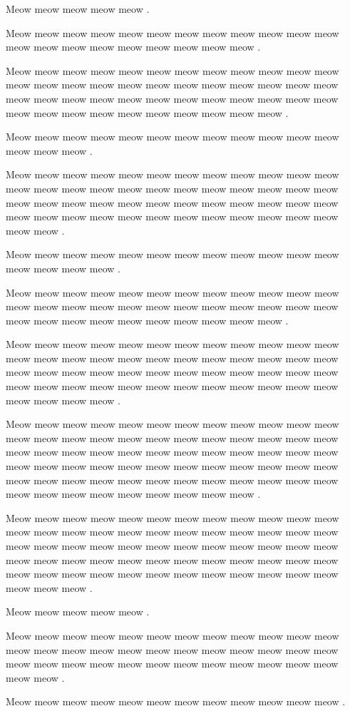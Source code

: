 \documentclass[12pt, a5paper, openany]{book}
\begin{document}
Meow meow meow meow meow .

Meow meow meow meow meow meow meow meow meow meow meow meow meow meow meow meow meow meow meow meow meow .

Meow meow meow meow meow meow meow meow meow meow meow meow meow meow meow meow meow meow meow meow meow meow meow meow meow meow meow meow meow meow meow meow meow meow meow meow meow meow meow meow meow meow meow meow meow meow .

Meow meow meow meow meow meow meow meow meow meow meow meow meow meow meow .

Meow meow meow meow meow meow meow meow meow meow meow meow meow meow meow meow meow meow meow meow meow meow meow meow meow meow meow meow meow meow meow meow meow meow meow meow meow meow meow meow meow meow meow meow meow meow meow meow meow meow .

Meow meow meow meow meow meow meow meow meow meow meow meow meow meow meow meow .

Meow meow meow meow meow meow meow meow meow meow meow meow meow meow meow meow meow meow meow meow meow meow meow meow meow meow meow meow meow meow meow meow meow meow .

Meow meow meow meow meow meow meow meow meow meow meow meow meow meow meow meow meow meow meow meow meow meow meow meow meow meow meow meow meow meow meow meow meow meow meow meow meow meow meow meow meow meow meow meow meow meow meow meow meow meow meow meow .

Meow meow meow meow meow meow meow meow meow meow meow meow meow meow meow meow meow meow meow meow meow meow meow meow meow meow meow meow meow meow meow meow meow meow meow meow meow meow meow meow meow meow meow meow meow meow meow meow meow meow meow meow meow meow meow meow meow meow meow meow meow meow meow meow meow meow meow meow meow .

Meow meow meow meow meow meow meow meow meow meow meow meow meow meow meow meow meow meow meow meow meow meow meow meow meow meow meow meow meow meow meow meow meow meow meow meow meow meow meow meow meow meow meow meow meow meow meow meow meow meow meow meow meow meow meow meow meow meow meow meow meow meow meow .

Meow meow meow meow meow .

Meow meow meow meow meow meow meow meow meow meow meow meow meow meow meow meow meow meow meow meow meow meow meow meow meow meow meow meow meow meow meow meow meow meow meow meow meow meow .

Meow meow meow meow meow meow meow meow meow meow meow meow .
\end{document}
